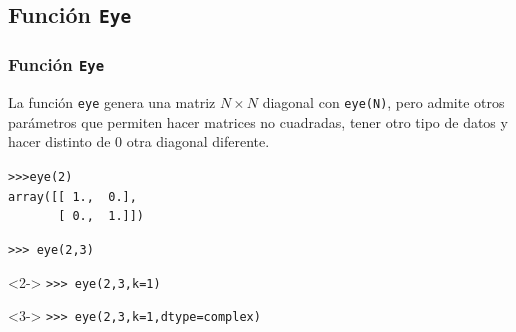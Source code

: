 \subsection{Funci\'{o}n \texttt{Eye}}
\begin{frame}[fragile]
\frametitle{Funci\'{o}n \texttt{Eye}}
La funci\'{o}n \texttt{eye} genera una matriz $N \times	N$ diagonal con \verb|eye(N)|, pero admite otros par\'{a}metros que permiten hacer matrices no cuadradas, tener otro tipo de datos y hacer distinto de $0$ otra diagonal diferente.
\begin{exampleblock}{}
\verb|>>>eye(2)| \\
\pause
\verb|array([[ 1.,  0.],| \\
\verb|       [ 0.,  1.]])|
\end{exampleblock}
\end{frame}
\begin{frame}[fragile]
\begin{exampleblock}{}
\verb|>>> eye(2,3)| \\
\pause
{}
\end{exampleblock}
\begin{exampleblock}{}<2->
\verb|>>> eye(2,3,k=1)| \\
\end{exampleblock}
\begin{exampleblock}{}<3->
\verb|>>> eye(2,3,k=1,dtype=complex)| \\
\end{exampleblock}
\end{frame}
